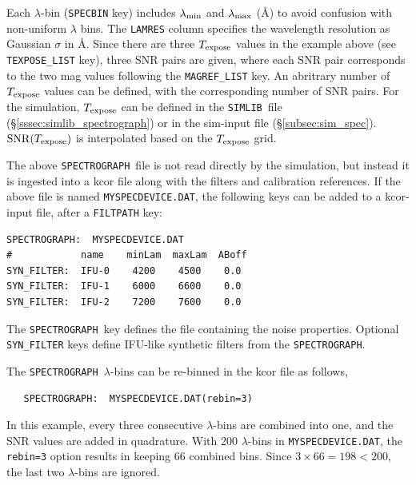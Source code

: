 \documentclass[12pt]{article}
\newcommand{\SPEC}{{\tt SPECTROGRAPH}}
\newcommand{\Texpose}{T_{\rm expose}}
\newcommand{\simlib}{{\tt SIMLIB}}
\newcommand{\lam}{\lambda}
\begin{document}
{Each $\lam$-bin ({\tt SPECBIN} key) includes 
$\lam_{\rm min}$ and $\lam_{\rm max}$ (\AA)
to avoid confusion with non-uniform $\lam$ bins. 
The {\tt LAMRES} column specifies the wavelength resolution
as Gaussian $\sigma$ in \AA.
Since there are three $\Texpose$ values in the example above
(see {\tt TEXPOSE\_LIST} key),
three SNR pairs are given, where each SNR pair corresponds
to the two mag values following the {\tt MAGREF\_LIST} key.
An abritrary number of $\Texpose$ values can be defined,
with the corresponding number of SNR pairs.
For the simulation, $\Texpose$ can be defined in the
\simlib\ file (\S\ref{sssec:simlib_spectrograph})
or in the sim-input file (\S\ref{subsec:sim_spec}).
${\rm SNR}(\Texpose)$ is interpolated based on the $\Texpose$ grid.

The above \SPEC\ file is not read directly by the simulation,
but instead it is ingested into a kcor file along with the
filters and calibration references.
If the above file is named {\tt MYSPECDEVICE.DAT},
the following keys can be added to a kcor-input file,
after a {\tt FILTPATH} key:

\clearpage
%
\begin{Verbatim}[frame=single]
SPECTROGRAPH:  MYSPECDEVICE.DAT
#            name    minLam  maxLam  ABoff
SYN_FILTER:  IFU-0    4200    4500    0.0
SYN_FILTER:  IFU-1    6000    6600    0.0
SYN_FILTER:  IFU-2    7200    7600    0.0 
\end{Verbatim}
The \SPEC\ key defines the file containing the noise properties.
Optional {\tt SYN\_FILTER} keys define IFU-like synthetic
filters from the \SPEC. 

The \SPEC\ $\lam$-bins can be re-binned in the kcor file
as follows,
\begin{verbatim}
   SPECTROGRAPH:  MYSPECDEVICE.DAT(rebin=3)
\end{verbatim}
%
In this example, every three consecutive $\lam$-bins are combined
into one, and the SNR values are added in quadrature. 
With 200 $\lam$-bins in {\tt MYSPECDEVICE.DAT}, the {\tt rebin=3}
option results in keeping 66 combined bins. Since $3\times 66=198 < 200$,
the last two $\lam$-bins are ignored.

\bigskip

\newcommand{\Rpredict}{{\rm R}_{\rm SNR-Poiss}}  %
\newcommand{\RSNR}{{\rm R}_{\rm SNR}}           %
\newcommand{\RRabort}{{\cal R}_{\rm Abort}}    %

}
\end{document}
